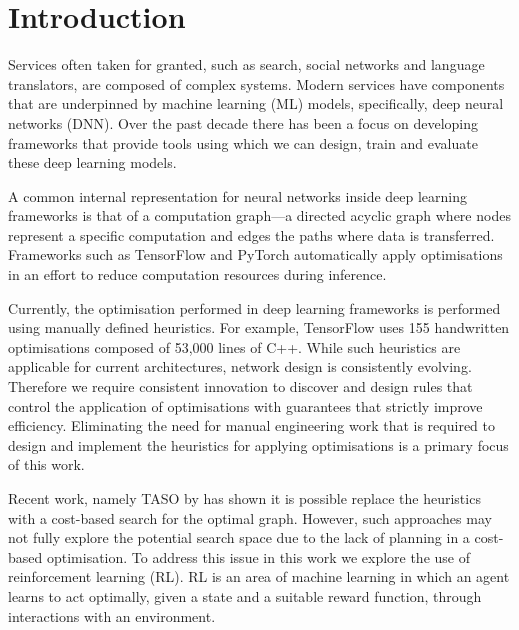 \chapter{Introduction}

Services often taken for granted, such as search, social networks and language translators, are composed of complex systems. Modern services have components that are underpinned by machine learning (ML) models, specifically, deep neural networks (DNN). Over the past decade there has been a focus on developing frameworks that provide tools using which we can design, train and evaluate these deep learning models.

A common internal representation for neural networks inside deep learning frameworks is that of a computation graph---a directed acyclic graph where nodes represent a specific computation and edges the paths where data is transferred. Frameworks such as TensorFlow \cite{tensorflow2015-whitepaper} and PyTorch \cite{pytorch} automatically apply optimisations in an effort to reduce computation resources during inference.

Currently, the optimisation performed in deep learning frameworks is performed using manually defined heuristics. For example, TensorFlow \cite{tensorflow2015-whitepaper} uses 155 handwritten optimisations composed of 53,000 lines of C++. While such heuristics are applicable for current architectures, network design is consistently evolving. Therefore we require consistent innovation to discover and design rules that control the application of optimisations with guarantees that strictly improve efficiency. Eliminating the need for manual engineering work that is required to design and implement the heuristics for applying optimisations is a primary focus of this work.

Recent work, namely TASO by \citet{jia2019taso,jia2019optimizing} has shown it is possible replace the heuristics with a cost-based search for the optimal graph. However, such approaches may not fully explore the potential search space due to the lack of planning in a cost-based optimisation. To address this issue in this work we explore the use of reinforcement learning (RL). RL is an area of machine learning in which an agent learns to act optimally, given a state and a suitable reward function, through interactions with an environment.


